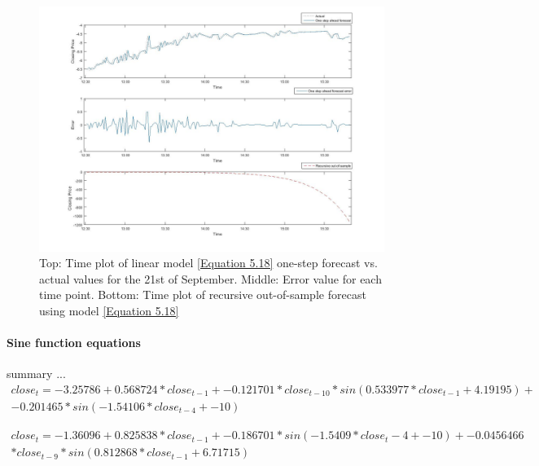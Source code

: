 \documentclass[13pt]{report}
\begin{document}
\begin{figure}[H]
\centering
\label{VWlinear21fig}
\includegraphics[width=\textwidth]{21linear}
\caption{Top: Time plot of linear model \ref{Equation 5.18} one-step forecast vs. actual values for the 21st of September. Middle: Error value for each time point. Bottom: Time plot of recursive out-of-sample forecast using model \ref{Equation 5.18}}
\end{figure}

\paragraph{Sine function equations}\hfill \break
summary ...
\begin{equation}
\begin{align*}
close_{t} = -3.25786 + 0.568724 * close_{t-1} + -0.121701 * close_{t-10} * sin ( 0.533977 * close_{t-1} + 4.19195 ) + \\ -0.201465 * sin ( -1.54106 * close_{t-4} + -10 ) 
\end{align*}
\label{Equation 5.19}
\end{equation}

\begin{equation}
\begin{align*}
close_{t} = -1.36096 + 0.825838 * close_{t-1} + -0.186701 * sin ( -1.5409 * close_t-4 + -10 ) + -0.0456466 \\ * close_{t-9} * sin ( 0.812868 * close_{t-1} + 6.71715 )
\end{align*}
\label{Equation 5.20}
\end{equation}
\end{document}
